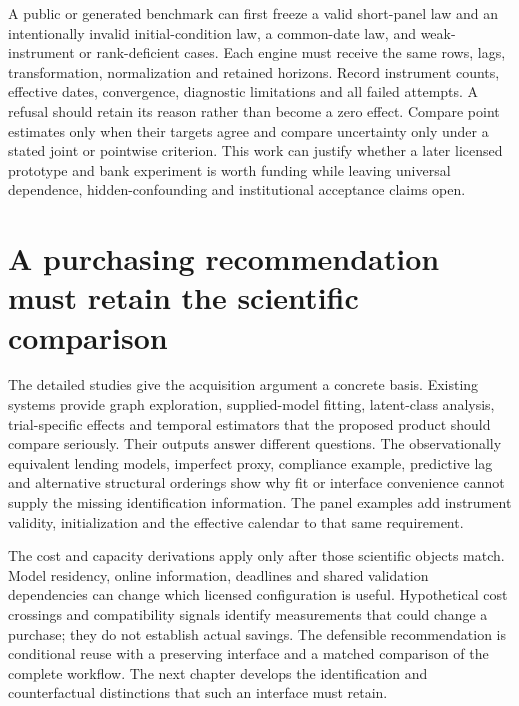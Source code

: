 A public or generated benchmark can first freeze a valid short-panel law and
an intentionally invalid initial-condition law, a common-date law, and
weak-instrument or rank-deficient cases. Each engine must receive the same
rows, lags, transformation, normalization and retained horizons. Record
instrument counts, effective dates, convergence, diagnostic limitations and
all failed attempts. A refusal should retain its reason rather than become
a zero effect. Compare point estimates only when their targets agree and
compare uncertainty only under a stated joint or pointwise criterion. This
work can justify whether a later licensed prototype and bank experiment is
worth funding while leaving universal dependence, hidden-confounding and
institutional acceptance claims open.

\section{A purchasing recommendation must retain the scientific comparison}

The detailed studies give the acquisition argument a concrete basis. Existing
systems provide graph exploration, supplied-model fitting, latent-class
analysis, trial-specific effects and temporal estimators that the proposed
product should compare seriously. Their outputs answer different questions.
The observationally equivalent lending models, imperfect proxy, compliance
example, predictive lag and alternative structural orderings show why fit or
interface convenience cannot supply the missing identification information.
The panel examples add instrument validity, initialization and the effective
calendar to that same requirement.

The cost and capacity derivations apply only after those scientific objects
match. Model residency, online information, deadlines and shared validation
dependencies can change which licensed configuration is useful. Hypothetical
cost crossings and compatibility signals identify measurements that could
change a purchase; they do not establish actual savings. The defensible
recommendation is conditional reuse with a preserving interface and a matched
comparison of the complete workflow. The next chapter develops the
identification and counterfactual distinctions that such an interface must
retain.
